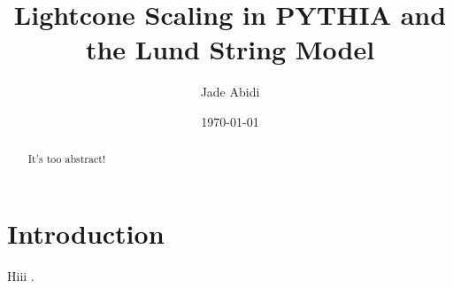 \documentclass[12pt,a4paper]{report}
\begin{document}
\title{Lightcone Scaling in PYTHIA and the Lund String Model}
\author{Jade Abidi}
\date{\today}
\maketitle

\begin{abstract}
  It's too abstract!
\end{abstract}

\tableofcontents

\chapter{Introduction}
Hiii \cite{einstein1905}.



\end{document}
